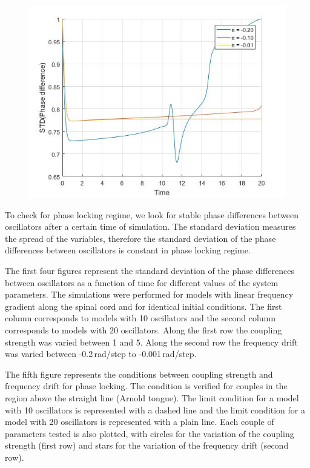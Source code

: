 \documentclass[a4paper]{scrartcl}
\begin{document}
\begin{minipage}{0.33\textwidth}
	\begin{figure}[H]
		\includegraphics[width=\textwidth]{results/6.a/N20_A_const.jpg}
	\end{figure}
\end{minipage}\hfill
\begin{minipage}{0.33\textwidth}
\end{minipage}

To check for phase locking regime, we look for stable phase differences between oscillators after a certain time of simulation. The standard deviation measures the spread of the variables, therefore the standard deviation of the phase differences between oscillators is constant in phase locking regime. 

The first four figures represent the standard deviation of the phase differences between oscillators as a function of time for different values of the system parameters. The simulations were performed for models with linear frequency gradient along the spinal cord and for identical initial conditions. The first column corresponds to models with 10 oscillators and the second column corresponds to models with 20 oscillators. Along the first row the coupling strength was varied between 1 and 5. Along the second row the frequency drift was varied between -0.2\,rad/step to -0.001\,rad/step. 

The fifth figure represents the conditions between coupling strength and frequency drift for phase locking. The condition is verified for couples in the region above the straight line (Arnold tongue). The limit condition for a model with 10 oscillators is represented with a dashed line and the limit condition for a model with 20 oscillators is represented with a plain line. Each couple of parameters tested is also plotted, with circles for the variation of the coupling strength (first row) and stars for the variation of the frequency drift (second row).
\end{document}
